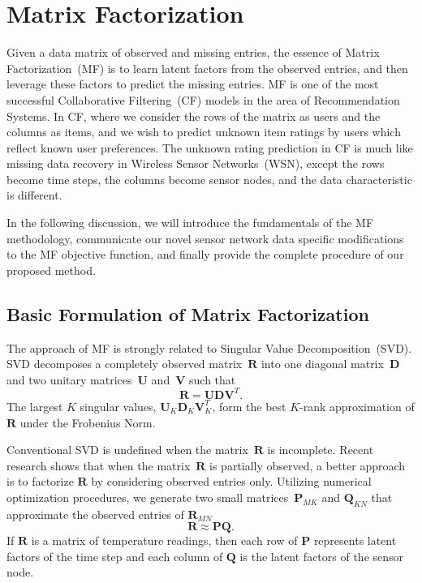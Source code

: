 \section{Matrix Factorization}  \label{sec:mf}

Given a data matrix of observed and missing entries, the essence of Matrix Factorization~(MF) is to learn latent factors from the observed entries, and then leverage these factors to predict the missing entries.
MF is one of the most successful Collaborative Filtering~(CF) models in the area of Recommendation Systems.
In CF, where we consider the rows of the matrix as users and the columns as items, and we wish to predict unknown item ratings by users which reflect known user preferences.
The unknown rating prediction in CF is much like missing data recovery in Wireless Sensor Networks~(WSN), except the rows become time steps, the columns become sensor nodes, and the data characteristic is different. 

In the following discussion, we will introduce the fundamentals of the MF methodology, communicate our novel sensor network data specific modifications to the MF objective function, and finally provide the complete procedure of our proposed method.

\subsection{Basic Formulation of Matrix Factorization}

The approach of MF is strongly related to Singular Value Decomposition~(SVD).
SVD decomposes a completely observed matrix~$\mathbf{R}$ into one diagonal matrix~$\mathbf{D}$ and two unitary matrices~$\mathbf{U}$ and~$\mathbf{V}$ such that
\begin{equation*} \mathbf{R} = \mathbf{U}\mathbf{D}\mathbf{V}^T. \end{equation*}
The largest $K$ singular values, $\mathbf{U}_K \mathbf{D}_K \mathbf{V}_K^T$, form the best $K$-rank approximation of $\mathbf{R}$ under the Frobenius Norm. 

Conventional SVD is undefined when the matrix~$\mathbf{R}$ is incomplete.
Recent research shows\cite{koren2009matrix} that when the matrix~$\mathbf{R}$ is partially observed, a better approach is to factorize $\mathbf{R}$ by considering observed entries only.
Utilizing numerical optimization procedures, we generate two small matrices~$\mathbf{P}_{MK}$ and $\mathbf{Q}_{KN}$ that approximate the observed entries of $\mathbf{R}_{MN}$
\begin{equation*}\mathbf{R} \approx \mathbf{P} \mathbf{Q}.\end{equation*}
If $\mathbf{R}$ is a matrix of temperature readings, then each row of $\mathbf{P}$ represents latent factors of the time step and each column of $\mathbf{Q}$ is the latent factors of the sensor node.

